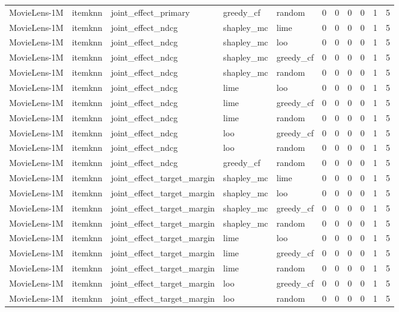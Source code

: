 \begin{table}[t]
{\begin{tabular}{lllllrrrrrr}
MovieLens-1M & itemknn & joint\_effect\_primary & greedy\_cf & random & 0 & 0 & 0 & 0 & 1 & 5 \\
MovieLens-1M & itemknn & joint\_effect\_ndcg & shapley\_mc & lime & 0 & 0 & 0 & 0 & 1 & 5 \\
MovieLens-1M & itemknn & joint\_effect\_ndcg & shapley\_mc & loo & 0 & 0 & 0 & 0 & 1 & 5 \\
MovieLens-1M & itemknn & joint\_effect\_ndcg & shapley\_mc & greedy\_cf & 0 & 0 & 0 & 0 & 1 & 5 \\
MovieLens-1M & itemknn & joint\_effect\_ndcg & shapley\_mc & random & 0 & 0 & 0 & 0 & 1 & 5 \\
MovieLens-1M & itemknn & joint\_effect\_ndcg & lime & loo & 0 & 0 & 0 & 0 & 1 & 5 \\
MovieLens-1M & itemknn & joint\_effect\_ndcg & lime & greedy\_cf & 0 & 0 & 0 & 0 & 1 & 5 \\
MovieLens-1M & itemknn & joint\_effect\_ndcg & lime & random & 0 & 0 & 0 & 0 & 1 & 5 \\
MovieLens-1M & itemknn & joint\_effect\_ndcg & loo & greedy\_cf & 0 & 0 & 0 & 0 & 1 & 5 \\
MovieLens-1M & itemknn & joint\_effect\_ndcg & loo & random & 0 & 0 & 0 & 0 & 1 & 5 \\
MovieLens-1M & itemknn & joint\_effect\_ndcg & greedy\_cf & random & 0 & 0 & 0 & 0 & 1 & 5 \\
MovieLens-1M & itemknn & joint\_effect\_target\_margin & shapley\_mc & lime & 0 & 0 & 0 & 0 & 1 & 5 \\
MovieLens-1M & itemknn & joint\_effect\_target\_margin & shapley\_mc & loo & 0 & 0 & 0 & 0 & 1 & 5 \\
MovieLens-1M & itemknn & joint\_effect\_target\_margin & shapley\_mc & greedy\_cf & 0 & 0 & 0 & 0 & 1 & 5 \\
MovieLens-1M & itemknn & joint\_effect\_target\_margin & shapley\_mc & random & 0 & 0 & 0 & 0 & 1 & 5 \\
MovieLens-1M & itemknn & joint\_effect\_target\_margin & lime & loo & 0 & 0 & 0 & 0 & 1 & 5 \\
MovieLens-1M & itemknn & joint\_effect\_target\_margin & lime & greedy\_cf & 0 & 0 & 0 & 0 & 1 & 5 \\
MovieLens-1M & itemknn & joint\_effect\_target\_margin & lime & random & 0 & 0 & 0 & 0 & 1 & 5 \\
MovieLens-1M & itemknn & joint\_effect\_target\_margin & loo & greedy\_cf & 0 & 0 & 0 & 0 & 1 & 5 \\
MovieLens-1M & itemknn & joint\_effect\_target\_margin & loo & random & 0 & 0 & 0 & 0 & 1 & 5 \\

\end{tabular}}
\end{table}
